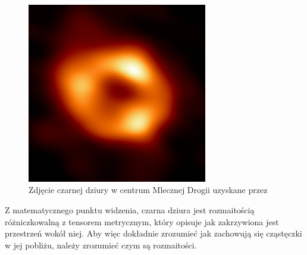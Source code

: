 \renewcommand{\figurename}{Zdjęcie}
\begin{figure}[h]
  \centering
  \includegraphics[width=0.7\textwidth]{ilustracje/zakazany_donut.jpg}
  \caption{Zdjęcie czarnej dziury w centrum Mlecznej Drogii uzyskane przez \cite{mleczna_droga}}
\end{figure}

Z matematycznego punktu widzenia, czarna dziura jest rozmaitością różniczkowalną z tensorem metrycznym, który opisuje jak zakrzywiona jest przestrzeń wokół niej. Aby więc dokładnie zrozumieć jak zachowują się cząstęczki w jej pobliżu, należy zrozumieć czym są rozmaitości.%
